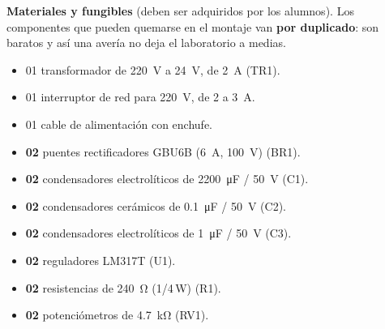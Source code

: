 \documentclass[11pt,a4paper]{article}
\begin{document}
\vspace{0.25cm}
\noindent\textbf{Materiales y fungibles} (deben ser adquiridos por los alumnos). Los
componentes que pueden quemarse en el montaje van \textbf{por duplicado}: son baratos y
así una avería no deja el laboratorio a medias.
\begin{itemize}
    \item 01 transformador de \qty{220}{\volt} a \qty{24}{\volt}, de \qty{2}{\ampere}
          (TR1).
    \item 01 interruptor de red para \qty{220}{\volt}, de 2 a \qty{3}{\ampere}.
    \item 01 cable de alimentación con enchufe.
    \item \textbf{02} puentes rectificadores GBU6B (\qty{6}{\ampere}, \qty{100}{\volt})
          (BR1).
    \item \textbf{02} condensadores electrolíticos de \qty{2200}{\micro\farad} /
          \qty{50}{\volt} (C1).
    \item \textbf{02} condensadores cerámicos de \qty{0.1}{\micro\farad} /
          \qty{50}{\volt} (C2).
    \item \textbf{02} condensadores electrolíticos de \qty{1}{\micro\farad} /
          \qty{50}{\volt} (C3).
    \item \textbf{02} reguladores LM317T (U1).
    \item \textbf{02} resistencias de \qty{240}{\ohm} (1/4\,\unit{\watt}) (R1).
    \item \textbf{02} potenciómetros de \qty{4.7}{\kilo\ohm} (RV1).

\end{itemize}
\end{document}
